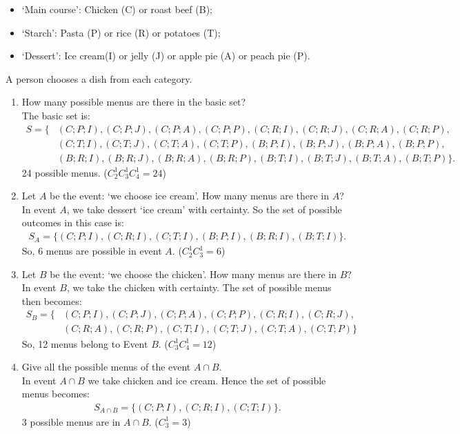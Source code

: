 \documentclass[12pt,thmsa]{article}\usepackage[]{graphicx}\usepackage[]{color}
\begin{document}
\begin{itemize}
\item `Main course': Chicken (C) or roast beef (B);
\item `Starch': Pasta (P) or rice (R) or potatoes (T);
\item `Dessert': Ice cream(I) or jelly (J) or apple pie (A) or peach pie (P).
\end{itemize}

A person chooses a dish from each category.

\begin{enumerate}
\item How many possible menus are there in the basic set?\\
The basic set is:
\begin{align*}
S= \{ & (C;P;I), (C;P;J), (C;P;A), (C;P;P), (C;R;I), (C;R;J), (C;R;A), (C;R;P),\\ & (C;T;I), (C;T;J), (C;T;A), (C;T;P),  (B;P;I), (B;P;J), (B;P;A), (B;P;P),\\ & (B;R;I), (B;R;J), (B;R;A), (B;R;P),(B;T;I), (B;T;J), (B;T;A), (B;T;P) \}.
\end{align*}
24 possible menus. ($C^{1}_{2}C^{1}_{3}C^{1}_{4}=24$)
\medskip

\item Let $A$ be the event: `we choose ice cream'. How many menus are there in $A$?\\
In event $A$, we take dessert `ice cream' with certainty. So the set of possible outcomes in this case is:
\begin{align*}
S_A = \{ (C;P;I),(C;R;I), (C;T;I), (B;P;I),(B;R;I), (B;T;I)   \}.
\end{align*}
So, 6 menus are possible in event $A$. ($C^{1}_{2}C^{1}_{3}=6$)
\medskip

\item  Let $B$ be the event: `we choose the chicken'. How many menus are there in $B$?\\
In event $B$, we take the chicken with certainty. The set of possible menus then becomes:
\begin{align*}
S_B = \{  & (C;P;I), (C;P;J), (C;P;A), (C;P;P), (C;R;I), (C;R;J), \\ & (C;R;A), (C;R;P), (C;T;I), (C;T;J), (C;T;A), (C;T;P) \}
\end{align*}
So, 12 menus belong to Event $B$. ($C^{1}_{3}C^{1}_{4}=12$)
\medskip

\item Give all the possible menus of the event $A \cap B$.\\
In event $A\cap B$ we take chicken and ice cream. Hence the set of possible menus becomes:
\begin{align*}
S_{A \cap B} = \{ (C;P;I),(C;R;I),(C;T;I)  \}.
\end{align*}
3 possible menus are in $A\cap B$. ($C^{1}_{3}=3$)
\medskip


\end{enumerate}
\end{document}
